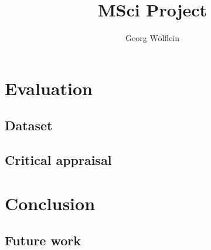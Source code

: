 \documentclass[a4paper,oneside]{book}
\author{Georg Wölflein}
\title{MSci Project}
\DeclareRobustCommand{\[}{\begin{equation}}
\DeclareRobustCommand{\]}{\end{equation}}
\DeclareRobustCommand{\(}{\begin{equation*}}
\DeclareRobustCommand{\)}{\end{equation*}}
\begin{document}
\frontmatter


\tableofcontents
\listoffigures
\listoftables


\mainmatter




\chapter{Evaluation}
\section{Dataset}
\section{Critical appraisal}
\chapter{Conclusion}
\section{Future work}

\printglossary[type=\acronymtype]
\printbibliography[heading=bibintoc]

\appendix


\end{document}
